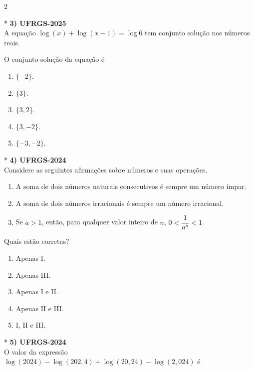 \documentclass[11pt,a4paper]{article}
\begin{document}
\begin{paracol}{2}
\switchcolumn[1]
\vspace{6cm}

\switchcolumn[0]*
\textbf{3) UFRGS-2025} \\
A equação $\log(x) + \log(x - 1) = \log 6$ tem conjunto solução nos números reais. 

O conjunto solução da equação é

\begin{enumerate}[label=(\Alph*)]
    \item $\{-2\}$.
    \item $\{3\}$.
    \item $\{3, 2\}$.
    \item $\{3, -2\}$.
    \item $\{-3, -2\}$.
\end{enumerate}
\vspace{0.4cm}

\switchcolumn[1]
\vspace{6cm}

\switchcolumn[0]*
\textbf{4) UFRGS-2024} \\
Considere as seguintes afirmações sobre números e suas operações.

\begin{enumerate}[label=\Roman*., itemsep=0.2cm]
    \item A soma de dois números naturais consecutivos é sempre um número ímpar.
    \item A soma de dois números irracionais é sempre um número irracional.
    \item Se $a > 1$, então, para qualquer valor inteiro de $n$, $0 < \dfrac{1}{a^n} < 1$.
\end{enumerate}

Quais estão corretas?

\begin{enumerate}[label=(\Alph*)]
    \item Apenas I.
    \item Apenas III.
    \item Apenas I e II.
    \item Apenas II e III.
    \item I, II e III.
\end{enumerate}
\vspace{0.4cm}

\switchcolumn[1]
\vspace{7cm} 

\switchcolumn[0]*
\textbf{5) UFRGS-2024} \\
O valor da expressão \\
$\log(2024) - \log(202{,}4) + \log(20{,}24) - \log(2{,}024)$ é


\end{paracol}
\end{document}
